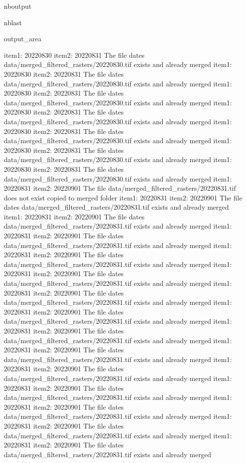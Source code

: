 \documentclass[letterpaper,10pt]{sphinxmanual}
\begin{document}
\begin{sphinxuseclass}{nboutput}
\begin{sphinxuseclass}{nblast}
{\begin{sphinxuseclass}{output_area}
\begin{sphinxuseclass}{}
\begin{sphinxVerbatim}[commandchars=\\\{\}]
item1:  20220830
item2:  20220831
The file dates data/merged\_filtered\_rasters/20220830.tif exists and already merged
item1:  20220830
item2:  20220831
The file dates data/merged\_filtered\_rasters/20220830.tif exists and already merged
item1:  20220830
item2:  20220831
The file dates data/merged\_filtered\_rasters/20220830.tif exists and already merged
item1:  20220830
item2:  20220831
The file dates data/merged\_filtered\_rasters/20220830.tif exists and already merged
item1:  20220830
item2:  20220831
The file dates data/merged\_filtered\_rasters/20220830.tif exists and already merged
item1:  20220830
item2:  20220831
The file dates data/merged\_filtered\_rasters/20220830.tif exists and already merged
item1:  20220830
item2:  20220831
The file dates data/merged\_filtered\_rasters/20220830.tif exists and already merged
item1:  20220831
item2:  20220901
The file data/merged\_filtered\_rasters/20220831.tif does not exist copied to merged folder
item1:  20220831
item2:  20220901
The file dates data/merged\_filtered\_rasters/20220831.tif exists and already merged
item1:  20220831
item2:  20220901
The file dates data/merged\_filtered\_rasters/20220831.tif exists and already merged
item1:  20220831
item2:  20220901
The file dates data/merged\_filtered\_rasters/20220831.tif exists and already merged
item1:  20220831
item2:  20220901
The file dates data/merged\_filtered\_rasters/20220831.tif exists and already merged
item1:  20220831
item2:  20220901
The file dates data/merged\_filtered\_rasters/20220831.tif exists and already merged
item1:  20220831
item2:  20220901
The file dates data/merged\_filtered\_rasters/20220831.tif exists and already merged
item1:  20220831
item2:  20220901
The file dates data/merged\_filtered\_rasters/20220831.tif exists and already merged
item1:  20220831
item2:  20220901
The file dates data/merged\_filtered\_rasters/20220831.tif exists and already merged
item1:  20220831
item2:  20220901
The file dates data/merged\_filtered\_rasters/20220831.tif exists and already merged
item1:  20220831
item2:  20220901
The file dates data/merged\_filtered\_rasters/20220831.tif exists and already merged
item1:  20220831
item2:  20220901
The file dates data/merged\_filtered\_rasters/20220831.tif exists and already merged
item1:  20220831
item2:  20220901
The file dates data/merged\_filtered\_rasters/20220831.tif exists and already merged
item1:  20220831
item2:  20220901
The file dates data/merged\_filtered\_rasters/20220831.tif exists and already merged
item1:  20220831
item2:  20220901
The file dates data/merged\_filtered\_rasters/20220831.tif exists and already merged

\end{sphinxVerbatim}
\end{sphinxuseclass}
\end{sphinxuseclass}}
\end{sphinxuseclass}
\end{sphinxuseclass}
\end{document}
